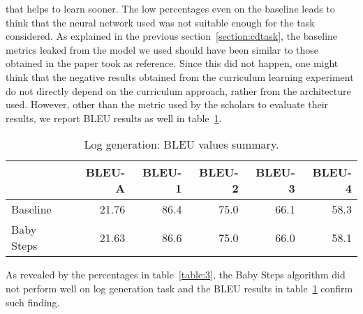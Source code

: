 that helps to learn sooner.
The low percentages even on the baseline
leads to think that the neural network used was not suitable enough for the task considered. 
As explained in the previous section~\ref{section:cdtask}, the baseline metrics leaked from the model we used
should have been similar to those obtained in the paper took as reference. Since this did not happen,
one might think that the negative results obtained from the curriculum learning experiment do not directly 
depend on the curriculum approach, rather from the architecture used.
However, other than the metric used by the scholars to evaluate their results, we report BLEU results as well in table~\ref{table:4}.
\begin{table}[h!]
    \centering
    \begin{tabular}{l|r|r|r|r|r}
     & BLEU-A & BLEU-1 & BLEU-2 & BLEU-3 & BLEU-4\\ [0.5ex] 
     \hline
     Baseline & 21.76 & 86.4 & 75.0 & 66.1 & 58.3\\  
     Baby Steps & 21.63 & 86.6 & 75.0 & 66.0 & 58.1\\ [1ex]
     \end{tabular}
    \caption{Log generation: BLEU values summary.}
    \label{table:4}
\end{table}
As revealed by the percentages in table~\ref{table:3}, the Baby Steps algorithm did not perform well
on log generation task and the BLEU results in table~\ref{table:4} confirm such finding.